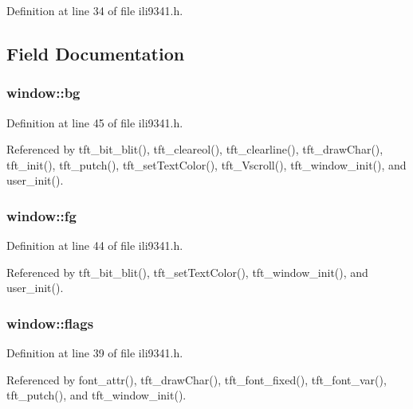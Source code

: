 Definition at line 34 of file ili9341.\-h.



\subsection{Field Documentation}
\hypertarget{structwindow_affcf5d29153103c2537542f5a4f8ba87}{
\subsubsection[{bg}]{ window\-::bg}}\label{structwindow_affcf5d29153103c2537542f5a4f8ba87}


Definition at line 45 of file ili9341.\-h.



Referenced by tft\-\_\-bit\-\_\-blit(), tft\-\_\-cleareol(), tft\-\_\-clearline(), tft\-\_\-draw\-Char(), tft\-\_\-init(), tft\-\_\-putch(), tft\-\_\-set\-Text\-Color(), tft\-\_\-\-Vscroll(), tft\-\_\-window\-\_\-init(), and user\-\_\-init().

\hypertarget{structwindow_ac8739cdb3c50efcc1deaa5ab955a5e62}{
\subsubsection[{fg}]{ window\-::fg}}\label{structwindow_ac8739cdb3c50efcc1deaa5ab955a5e62}


Definition at line 44 of file ili9341.\-h.



Referenced by tft\-\_\-bit\-\_\-blit(), tft\-\_\-set\-Text\-Color(), tft\-\_\-window\-\_\-init(), and user\-\_\-init().

\hypertarget{structwindow_ad58fae853f87093ef4f0139df0a3f33d}{
\subsubsection[{flags}]{ window\-::flags}}\label{structwindow_ad58fae853f87093ef4f0139df0a3f33d}


Definition at line 39 of file ili9341.\-h.



Referenced by font\-\_\-attr(), tft\-\_\-draw\-Char(), tft\-\_\-font\-\_\-fixed(), tft\-\_\-font\-\_\-var(), tft\-\_\-putch(), and tft\-\_\-window\-\_\-init().

